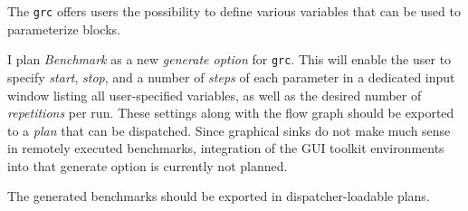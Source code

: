 \documentclass[a4paper]{IEEEtran}
\newcommand{\grc}{\texttt{grc}\xspace}
\begin{document}
The \grc offers users the possibility to define various variables that
can be used to parameterize blocks.

I plan \emph{Benchmark} as a new \textit{generate option} for \grc.
This will enable the user to specify \textsl{start}, \textsl{stop}, and a number of
\textsl{steps} of each parameter in a dedicated input window listing all user-specified
variables, as well as the desired number of \textsl{repetitions} per run.
These settings along with the flow graph should be exported to a \emph{plan} that can be
dispatched. Since graphical sinks do not make much sense in remotely executed benchmarks,
integration of the GUI toolkit environments into that generate option is currently not 
planned.

The generated benchmarks should be exported in dispatcher-loadable plans. 
\end{document}
